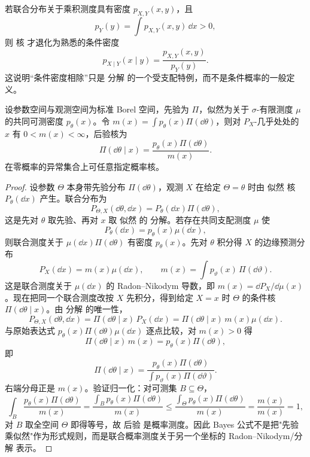 若联合分布关于乘积测度具有密度 $p_{X,Y}(x,y)$，且
\[
p_Y(y)=\int p_{X,Y}(x,y)\,\dd x>0,
\]
则 核 才退化为熟悉的条件密度
\begin{equation*}p_{X\mid Y}(x\mid y)
=\frac{p_{X,Y}(x,y)}{p_Y(y)}.\end{equation*}
这说明“条件密度相除”只是 分解 的一个受支配特例，而不是条件概率的一般定义。

\begin{proposition}
设参数空间与观测空间为标准 Borel 空间，先验为 $\Pi$，似然为关于 $\sigma$-有限测度 $\mu$ 的共同可测密度 $p_\theta(x)$。令 $m(x)=\int p_\theta(x)\Pi(\dd\theta)$，则对 $P_X$-几乎处处的 $x$ 有 $0<m(x)<\infty$，后验核为
\[
\Pi(\dd\theta\mid x)=\frac{p_\theta(x)\Pi(\dd\theta)}{m(x)}.
\]
在零概率的异常集合上可任意指定概率核。
\end{proposition}
\begin{proof}
设参数 $\Theta$ 本身带先验分布 $\Pi(\dd\theta)$，观测 $X$ 在给定 $\Theta=\theta$ 时由 似然 核 $P_\theta(\dd x)$ 产生。联合分布为
\[
P_{\Theta,X}(\dd\theta,\dd x)
=P_\theta(\dd x)\Pi(\dd\theta),
\]
这是先对 $\theta$ 取先验、再对 $x$ 取 似然 的 分解。若存在共同支配测度 $\mu$ 使
\[
P_\theta(\dd x)=p_\theta(x)\mu(\dd x),
\]
则联合测度关于 $\mu(\dd x)\Pi(\dd\theta)$ 有密度 $p_\theta(x)$。先对 $\theta$ 积分得 $X$ 的边缘预测分布
\[
P_X(\dd x)=m(x)\mu(\dd x),
\qquad
m(x)=\int p_\vartheta(x)\,\Pi(\dd\vartheta).
\]
这是联合测度关于 $\mu(\dd x)$ 的 Radon--Nikodym 导数，即 $m(x)=\dd P_X/\dd\mu(x)$。现在把同一个联合测度改按 $X$ 先积分，得到给定 $X=x$ 时 $\Theta$ 的条件核 $\Pi(\dd\theta\mid x)$。由 分解 的唯一性，
\[
P_{\Theta,X}(\dd\theta,\dd x)
=\Pi(\dd\theta\mid x)\,P_X(\dd x)
=\Pi(\dd\theta\mid x)\,m(x)\mu(\dd x).
\]
与原始表达式 $p_\theta(x)\Pi(\dd\theta)\mu(\dd x)$ 逐点比较，对 $m(x)>0$ 得
\[
\Pi(\dd\theta\mid x)\,m(x)=p_\theta(x)\Pi(\dd\theta),
\]
即
\begin{equation}
{
\Pi(\dd\theta\mid x)
=\frac{p_\theta(x)\Pi(\dd\theta)}
{\int p_\vartheta(x)\Pi(\dd\vartheta)}.
}
\label{eq:math-stat-bayes-kernel}
\end{equation}
右端分母正是 $m(x)$。验证归一化：对可测集 $B\subseteq\Theta$，
\[
\int_B\frac{p_\theta(x)\Pi(\dd\theta)}{m(x)}
=\frac{\int_B p_\theta(x)\Pi(\dd\theta)}{m(x)}
\le\frac{\int_\Theta p_\theta(x)\Pi(\dd\theta)}{m(x)}
=\frac{m(x)}{m(x)}=1,
\]
对 $B$ 取全空间 $\Theta$ 即得等号，故 后验 是概率测度。因此 Bayes 公式不是把"先验乘似然"作为形式规则，而是联合概率测度关于另一个坐标的 Radon--Nikodym/分解 表示。
\end{proof}


